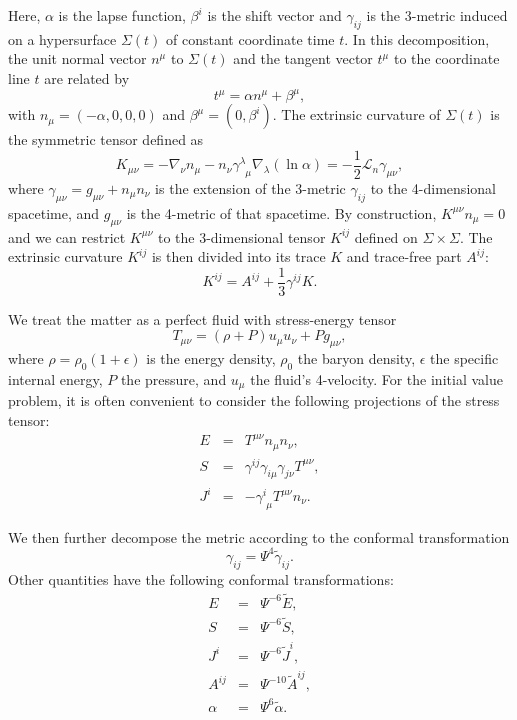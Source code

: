 Here, $\alpha$ is the lapse function, $\beta^i$ is the shift vector
and $\gamma_{ij}$ is the 3-metric induced on a hypersurface
$\Sigma(t)$ of constant coordinate time $t$. In this decomposition, the unit normal
vector $n^{\mu}$ to $\Sigma(t)$ and the tangent vector $t^{\mu}$ to
the coordinate line $t$ are related by
\begin{equation}
t^{\mu} = \alpha n^{\mu} + \beta^{\mu},
\end{equation}
with $n_\mu=(-\alpha,0,0,0)$ and $\beta^\mu=(0,\beta^i)$. The
extrinsic curvature of $\Sigma(t)$ is the symmetric tensor defined as
\begin{equation}
K_{\mu\nu} = -\nabla_\nu n_\mu -n_\nu \gamma^\lambda_{\phantom{\lambda}\mu} \nabla_\lambda (\ln \alpha) =
-\frac{1}{2}\mathcal{L}_n \gamma_{\mu\nu},
\end{equation}
where $\gamma_{\mu \nu}=g_{\mu \nu} + n_\mu n_\nu$ is the extension of
the 3-metric $\gamma_{ij}$ to the 4-dimensional spacetime, and $g_{\mu
  \nu}$ is the 4-metric of that spacetime. By construction, $K^{\mu
  \nu}n_\mu =0$ and we can restrict $K^{\mu \nu}$ to the 3-dimensional
tensor $K^{ij}$ defined on $\Sigma \times \Sigma$. The extrinsic
curvature $K^{ij}$ is then divided into its trace $K$ and trace-free
part $A^{ij}$:
\begin{equation}
K^{ij} = A^{ij} + \frac{1}{3}\gamma^{ij}K.
\end{equation}

We treat the matter as a perfect fluid with stress-energy tensor
\begin{equation}
T_{\mu\nu} = \left(\rho+P\right)u_{\mu}u_{\nu} + Pg_{\mu\nu},
\end{equation}
where $\rho=\rho_0 (1+\epsilon)$ is the energy density, $\rho_0$ the
baryon density, $\epsilon$ the specific internal energy, $P$ the
pressure, and $u_\mu$ the fluid's 4-velocity. For the initial value
problem, it is often convenient to consider the following projections
of the stress tensor:
\begin{eqnarray}
E &=& T^{\mu\nu}n_{\mu}n_{\nu}, \\ S &=&
\gamma^{ij}\gamma_{i\mu}\gamma_{j\nu}T^{\mu\nu},\\ J^{i} &=&
-\gamma^{i}_{\phantom{i}\mu}T^{\mu\nu}n_{\nu}.
\end{eqnarray}

We then further decompose the metric according to the conformal
transformation
\begin{equation}
\gamma_{ij} = \Psi^4\tilde{\gamma}_{ij}.
\end{equation}
Other quantities have the following conformal
transformations:
\begin{eqnarray}
E &=& \Psi^{-6}\tilde{E}, \\ S &=& \Psi^{-6}\tilde{S}, \\ J^{i} &=&
\Psi^{-6}\tilde{J}^i, \\ A^{ij} &=& \Psi^{-10}\tilde{A}^{ij},\\ \alpha
&=& \Psi^{6}\tilde{\alpha}.
\end{eqnarray}

